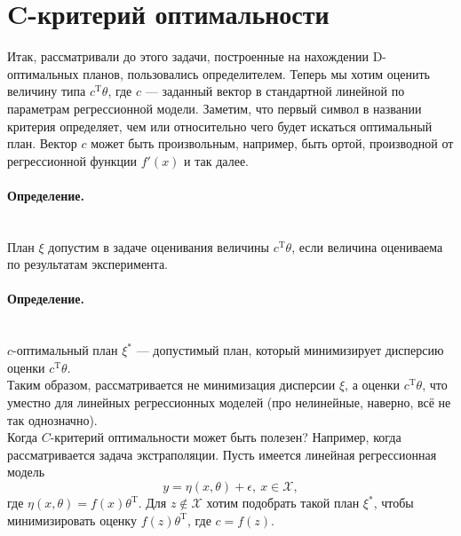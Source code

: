 \documentclass[12pt, a4paper]{article}
\newenvironment{definition}{\paragraph{Определение.}\hfill\\}{}
\begin{document}
	\section{C-критерий оптимальности}
	Итак, рассматривали до этого задачи, построенные на нахождении D-оптимальных планов, пользовались определителем. Теперь мы хотим оценить величину типа $c^\mathrm{T}\theta$, где $c$ --- заданный вектор в стандартной линейной по параметрам регрессионной модели. Заметим, что первый символ в названии критерия определяет, чем или относительно чего будет искаться оптимальный план. Вектор $c$ может быть произвольным, например, быть ортой, производной от регрессионной функции $f'(x)$ и так далее.\\
	\begin{definition}
		План $\xi$ допустим в задаче оценивания величины $c^\mathrm{T}\theta$, если величина оцениваема по результатам эксперимента. 	
	\end{definition}
	\begin{definition}
		$c$-оптимальный план $\xi^*$ --- допустимый план, который минимизирует дисперсию оценки $c^\mathrm{T}\theta$.
	\end{definition}\\
	Таким образом, рассматривается не минимизация дисперсии $\xi$, а оценки $c^\mathrm{T}\theta$, что уместно для линейных регрессионных моделей (про нелинейные, наверно, всё не так однозначно).\\
	Когда $C$-критерий оптимальности может быть полезен? Например, когда рассматривается задача экстраполяции. Пусть имеется линейная регрессионная модель
	\begin{equation*}
		y=\eta(x,\theta)+\epsilon,~x\in\mathcal{X},
	\end{equation*}
	где $\eta(x,\theta)=f(x)\theta^\mathrm{T}$. Для $z\not\in\mathcal{X}$ хотим подобрать такой план $\xi^*$, чтобы минимизировать оценку $f(z)\theta^\mathrm{T}$, где $c=f(z)$. 
\end{document}
